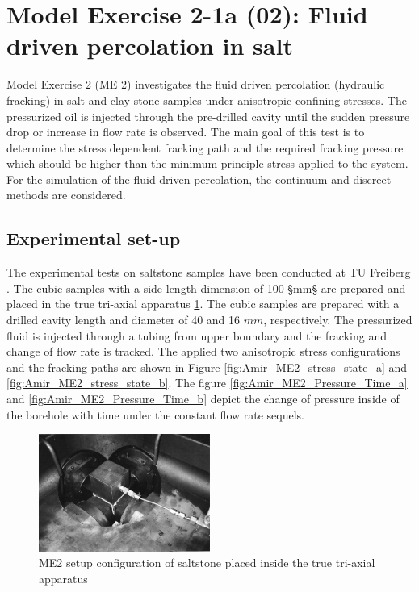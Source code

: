 \section{Model Exercise 2-1a (02): Fluid driven percolation in salt}
\label{sec:mex02}
Model Exercise 2 (ME 2) investigates the fluid driven percolation (hydraulic fracking) in salt and clay stone samples under anisotropic confining stresses. The pressurized oil is injected through the pre-drilled cavity until the sudden pressure drop or increase in flow rate is observed. The main goal of this test is to determine the stress dependent fracking path and the required fracking pressure which should be higher than the minimum principle stress applied to the system. For the simulation of the fluid driven percolation, the continuum and discreet methods are considered.
\subsection{Experimental set-up}
The experimental tests on saltstone samples have been conducted at TU Freiberg \cite{Kamlot2009}. The cubic samples with a side length dimension of 100 §mm§ are prepared and placed in the true tri-axial apparatus \ref{fig:Amir_ME2_Saltstone_Setup}. The cubic samples are prepared with a drilled cavity length and diameter of 40 and 16 $mm$, respectively. The pressurized fluid is injected through a tubing from upper boundary and the fracking and change of flow rate is tracked. The applied two anisotropic stress configurations and the fracking paths are shown in  Figure \ref{fig:Amir_ME2_stress_state_a} and \ref{fig:Amir_ME2_stress_state_b}. The figure \ref{fig:Amir_ME2_Pressure_Time_a} and \ref{fig:Amir_ME2_Pressure_Time_b} depict the change of pressure inside of the borehole with time under the constant flow rate sequels.

\begin{figure}[!ht]
\centering
\includegraphics[width=0.5\textwidth]{figures/Amir_ME2_Saltstone_Setup.png}
\caption{ME2 setup configuration of saltstone placed inside the true tri-axial apparatus \cite{Kamlot2009}}
\label{fig:Amir_ME2_Saltstone_Setup}
\end{figure}

